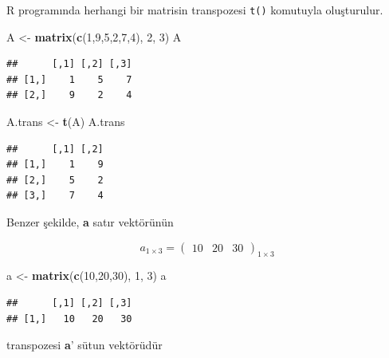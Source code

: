 \documentclass[
]{book}
\newenvironment{Shaded}{\begin{snugshade}}{\end{snugshade}}
\newcommand{\DecValTok}[1]{\textcolor[rgb]{0.00,0.00,0.81}{#1}}
\newcommand{\FunctionTok}[1]{\textcolor[rgb]{0.13,0.29,0.53}{\textbf{#1}}}
\newcommand{\NormalTok}[1]{#1}
\newcommand{\OtherTok}[1]{\textcolor[rgb]{0.56,0.35,0.01}{#1}}
\begin{document}
R programında herhangi bir matrisin transpozesi \texttt{t()} komutuyla oluşturulur.

\begin{Shaded}
\begin{Highlighting}[]
\NormalTok{ A }\OtherTok{\textless{}{-}} \FunctionTok{matrix}\NormalTok{(}\FunctionTok{c}\NormalTok{(}\DecValTok{1}\NormalTok{,}\DecValTok{9}\NormalTok{,}\DecValTok{5}\NormalTok{,}\DecValTok{2}\NormalTok{,}\DecValTok{7}\NormalTok{,}\DecValTok{4}\NormalTok{), }\DecValTok{2}\NormalTok{, }\DecValTok{3}\NormalTok{) }
\NormalTok{ A}
\end{Highlighting}
\end{Shaded}

\begin{verbatim}
##      [,1] [,2] [,3]
## [1,]    1    5    7
## [2,]    9    2    4
\end{verbatim}

\begin{Shaded}
\begin{Highlighting}[]
\NormalTok{ A.trans }\OtherTok{\textless{}{-}} \FunctionTok{t}\NormalTok{(A)}
\NormalTok{ A.trans}
\end{Highlighting}
\end{Shaded}

\begin{verbatim}
##      [,1] [,2]
## [1,]    1    9
## [2,]    5    2
## [3,]    7    4
\end{verbatim}

Benzer şekilde, \textbf{a} satır vektörünün

\[a_{1×3} =
\begin{pmatrix}
 10 & 20 & 30
\end{pmatrix}_{1×3}\]

\begin{Shaded}
\begin{Highlighting}[]
\NormalTok{ a }\OtherTok{\textless{}{-}} \FunctionTok{matrix}\NormalTok{(}\FunctionTok{c}\NormalTok{(}\DecValTok{10}\NormalTok{,}\DecValTok{20}\NormalTok{,}\DecValTok{30}\NormalTok{), }\DecValTok{1}\NormalTok{, }\DecValTok{3}\NormalTok{) }
\NormalTok{ a }
\end{Highlighting}
\end{Shaded}

\begin{verbatim}
##      [,1] [,2] [,3]
## [1,]   10   20   30
\end{verbatim}

transpozesi \textbf{a}' sütun vektörüdür
\end{document}
